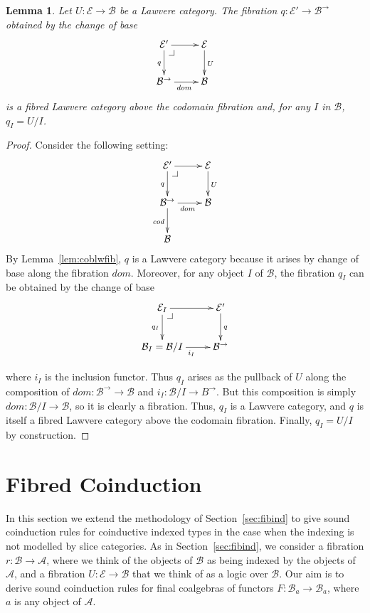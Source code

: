 \documentclass{LMCS}
\makeatletter
\newcommand{\ra}{\rightarrow}
\newcommand\lpbc[1][dr]{\save*!/#1-1.2pc/#1:(-1,1)@^{|-}\restore}
\newcommand\E{{\mathcal E}}
\newcommand\B{{\mathcal B}}
\newcommand\A{{\mathcal A}}
\theoremstyle{plain}
\newtheorem{lemma}[theorem]{Lemma}
\theoremstyle{remark}
\theoremstyle{definition}
\makeatother
\begin{document}
\begin{lemma}\label{lem:canlwfiba}
  Let $U:\E\to\B$ be a Lawvere category. The fibration
  $q:\E'\to\B^\to$ obtained by the change of base
  \[\xymatrix{
    \ar[d]_q \E' \ar[r] \lpbc & \E \ar[d]^U\\ \B^\to \ar[r]_{dom} & \B
  }\] is a fibred Lawvere category above the codomain fibration and,
  for any $I$ in $\B$, $q_I = U/I$.
\end{lemma}
\begin{proof}
  Consider the following setting:
  \[\xymatrix{
    \ar[d]_q \E' \ar[r] \lpbc & \E \ar[d]^U\\ \ar[d]_{cod} \B^\to
    \ar[r]_{dom} & \B\\ \B }\] By Lemma~\ref{lem:coblwfib}, $q$ is a
  Lawvere category because it arises by change of base along the
  fibration $dom$. Moreover, for any object $I$ of $\B$, the fibration
  $q_I$ can be obtained by the change of base
  \[\xymatrix{
    \ar[d]_{q_I} \E_I \ar[r] \lpbc & \E'\ar[d]^q \\
    \B_I = \B/I \ar[r]_{i_I} & \B^\to
  }\]

\vspace*{0.05in}

\noindent
  where $i_I$ is the inclusion functor. Thus $q_I$ arises as the
  pullback of $U$ along the composition of $dom:\B^\to \to \B$ and
  $i_I:\B/I \ra B^\to$. But this composition is simply $dom:\B/I \ra
  \B$, so it is clearly a fibration. Thus, $q_I$ is a Lawvere
  category, and $q$ is itself a fibred Lawvere category above the
  codomain fibration. Finally, $q_I = U/I$ by construction.
\end{proof}

\section{Fibred Coinduction}\label{sec:fibcoind}

In this section we extend the methodology of Section~\ref{sec:fibind}
to give sound coinduction rules for coinductive indexed types in the
case when the indexing is not modelled by slice categories. As in
Section~\ref{sec:fibind}, we consider a fibration $r:\B \ra \A$, where
we think of the objects of $\B$ as being indexed by the objects of
$\A$, and a fibration $U : \E \to \B$ that we think of as a logic over
$\B$. Our aim is to derive sound coinduction rules for final
coalgebras of functors $F:\B_a \ra \B_a$, where $a$ is any object of
$\A$.
\end{document}
